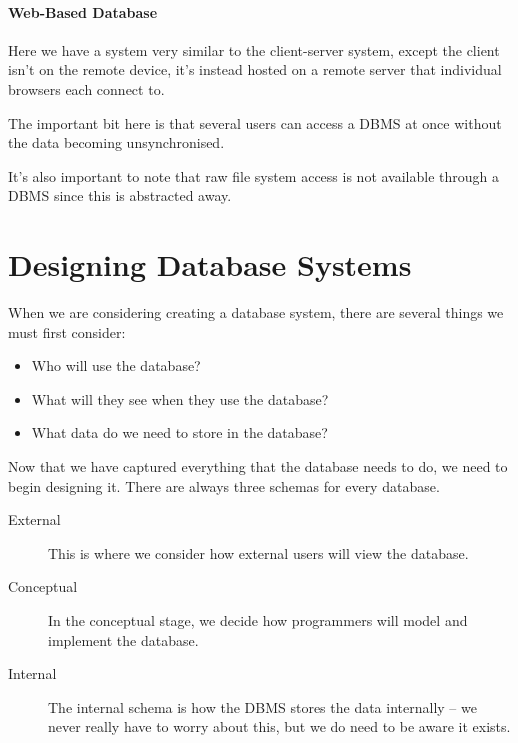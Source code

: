 \paragraph{Web-Based Database}\label{par:web_based_database}

Here we have a system very similar to the client-server system, except the client isn't on the remote device, it's instead hosted on a remote server that individual browsers each connect to.

\begin{note}
    The important bit here is that several users can access a DBMS at once without the data becoming unsynchronised.
\end{note}

\begin{note}
    It's also important to note that raw file system access is not available through a DBMS since this is abstracted away.
\end{note}

\section{Designing Database Systems}\label{sec:designing_database_system}

When we are considering creating a database system, there are several things we must first consider:
\begin{itemize}
    \item Who will use the database?
    \item What will they see when they use the database?
    \item What data do we need to store in the database?
\end{itemize}

Now that we have captured everything that the database needs to do, we need to begin designing it.
There are always three schemas for every database.
\begin{description}
    \item[External] This is where we consider how external users will view the database.
    \item[Conceptual] In the conceptual stage, we decide how programmers will model and implement the database.
    \item[Internal] The internal schema is how the DBMS stores the data internally -- we never really have to worry about this, but we do need to be aware it exists.
\end{description}

